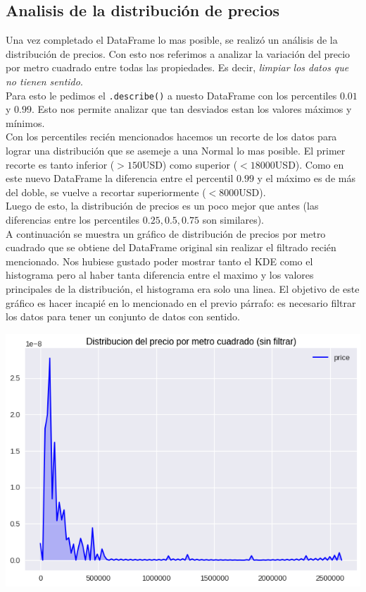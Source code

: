 \documentclass[a4paper, 10pt]{article}
\def\code#1{\texttt{#1}}
\newcommand\tab[1][0.5cm]{\hspace*{#1}}
\begin{document}
			\subsection{Analisis de la distribución de precios}
				Una vez completado el DataFrame lo mas posible, se realizó un análisis de la distribución de precios.
				Con esto nos referimos a analizar la variación del precio por metro cuadrado entre todas las
				propiedades. Es decir, \emph{limpiar los datos que no tienen sentido}. \\
				\tab Para esto le pedimos el \code{.describe()} a nuesto DataFrame con los percentiles $0.01$ y
				$0.99$. Esto nos permite analizar que tan desviados estan los valores máximos y mínimos. \\
				\tab Con los percentiles recién mencionados hacemos un recorte de los datos para lograr una distribución
				que se asemeje a una Normal lo mas posible. El primer recorte es tanto inferior ($ > 150$USD) como superior
				($<18000$USD). Como en este nuevo DataFrame la diferencia entre el percentil $0.99$ y el máximo es de más
				del doble, se vuelve a recortar superiormente ($<8000$USD). \\
				\tab Luego de esto, la distribución de precios es un poco mejor que antes (las diferencias entre los
				percentiles $0.25, 0.5, 0.75$ son similares). \\
				\tab A continuación se muestra un gráfico de distribución de precios por metro cuadrado que se obtiene
				del DataFrame original sin realizar el filtrado recién mencionado. Nos hubiese gustado poder mostrar tanto
				el KDE como el histograma pero al haber tanta diferencia entre el maximo y los valores principales de la
				distribución, el histograma era solo una linea. El objetivo de este gráfico es hacer incapié en lo mencionado
				en el previo párrafo: es necesario filtrar los datos para tener un conjunto de datos con sentido.
				\begin{center}
       				\includegraphics[width=\textwidth]{images/m2UnfilteredKDE}
		   		\end{center}
\end{document}
